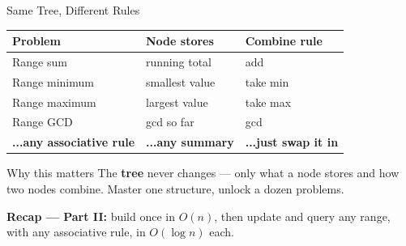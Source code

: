 \documentclass[10pt,aspectratio=169]{beamer}
\begin{document}
\begin{frame}{Same Tree, Different Rules}
\small
\begin{center}
\renewcommand{\arraystretch}{1.3}
\begin{tabular}{@{}lll@{}}
\toprule
\textbf{Problem} & \textbf{Node stores} & \textbf{Combine rule} \\
\midrule
Range sum      & running total     & add \\
Range minimum  & smallest value    & take min \\
Range maximum  & largest value     & take max \\
Range GCD      & gcd so far        & gcd \\
\rowcolor{lightblue!30}
\textbf{...any associative rule} & \textbf{...any summary} & \textbf{...just swap it in} \\
\bottomrule
\end{tabular}
\end{center}
\vspace{0.3cm}
\begin{block}{Why this matters}
The \textbf{tree} never changes --- only what a node stores and how two nodes combine. Master one structure, unlock a dozen problems.
\end{block}
\vspace{4pt}
{\centering\scriptsize\textcolor{navy!70}{\textbf{Recap --- Part II:} build once in $O(n)$, then update and query any range, with any associative rule, in $O(\log n)$ each.}}
\end{frame}
\end{document}
